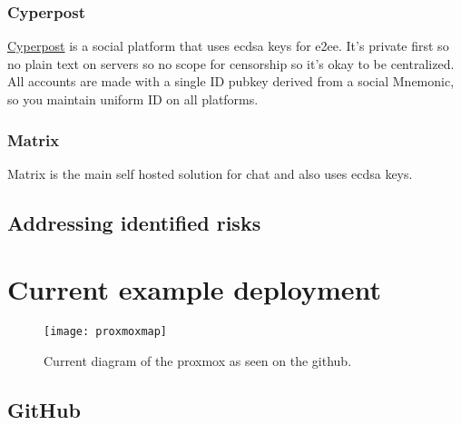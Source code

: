 \subsection{Cyperpost}
\href{https://github.com/i5hi/cypherpost/}{Cyperpost} is a social platform that uses ecdsa keys for e2ee. It's private first so no plain text on servers so no scope for censorship so it's okay to be centralized. All accounts are made with a single ID pubkey derived from a social Mnemonic, so you maintain uniform ID on all platforms.
\subsection{Matrix}
Matrix is the main self hosted solution for chat and also uses ecdsa keys.
\section{Addressing identified risks}
\chapter{Current example deployment }
\begin{figure*}[ht]\centering %
	\texttt{[image: proxmoxmap]}
	\caption{Current diagram of the proxmox as seen on the github.}
	\label{fig:proxmoxmap}
\end{figure*}
\section{GitHub }

